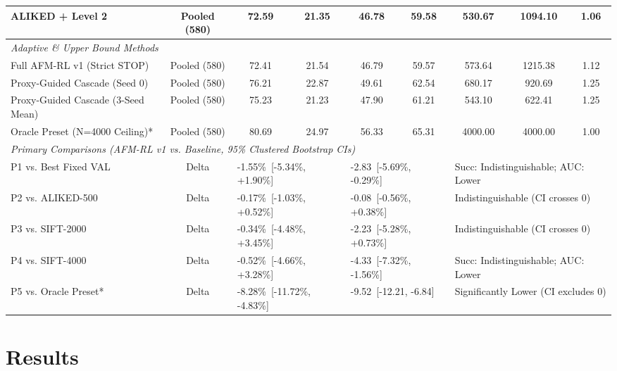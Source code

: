 \documentclass[conference]{IEEEtran}
\begin{document}
\begin{table}[t]
\begin{tabular}{lcccccccc}
ALIKED + Level 2 & Pooled (580) & 72.59 & 21.35 & 46.78 & 59.58 & 530.67 & 1094.10 & 1.06 \\
\hline
\multicolumn{9}{l}{\textit{Adaptive \& Upper Bound Methods}} \\
Full AFM-RL v1 (Strict STOP) & Pooled (580) & 72.41 & 21.54 & 46.79 & 59.57 & 573.64 & 1215.38 & 1.12 \\
Proxy-Guided Cascade (Seed 0) & Pooled (580) & 76.21 & 22.87 & 49.61 & 62.54 & 680.17 & 920.69 & 1.25 \\
Proxy-Guided Cascade (3-Seed Mean) & Pooled (580) & 75.23 & 21.23 & 47.90 & 61.21 & 543.10 & 622.41 & 1.25 \\
Oracle Preset (N=4000 Ceiling)* & Pooled (580) & 80.69 & 24.97 & 56.33 & 65.31 & 4000.00 & 4000.00 & 1.00 \\
\hline
\multicolumn{9}{l}{\textit{Primary Comparisons (AFM-RL v1 vs. Baseline, 95\% Clustered Bootstrap CIs)}} \\
P1 vs. Best Fixed VAL & Delta & \multicolumn{2}{l}{-1.55\%\ [-5.34\%, +1.90\%]} & \multicolumn{2}{l}{-2.83\ [-5.69\%, -0.29\%]} & \multicolumn{3}{l}{Succ: Indistinguishable; AUC: Lower} \\
P2 vs. ALIKED-500 & Delta & \multicolumn{2}{l}{-0.17\%\ [-1.03\%, +0.52\%]} & \multicolumn{2}{l}{-0.08\ [-0.56\%, +0.38\%]} & \multicolumn{3}{l}{Indistinguishable (CI crosses 0)} \\
P3 vs. SIFT-2000 & Delta & \multicolumn{2}{l}{-0.34\%\ [-4.48\%, +3.45\%]} & \multicolumn{2}{l}{-2.23\ [-5.28\%, +0.73\%]} & \multicolumn{3}{l}{Indistinguishable (CI crosses 0)} \\
P4 vs. SIFT-4000 & Delta & \multicolumn{2}{l}{-0.52\%\ [-4.66\%, +3.28\%]} & \multicolumn{2}{l}{-4.33\ [-7.32\%, -1.56\%]} & \multicolumn{3}{l}{Succ: Indistinguishable; AUC: Lower} \\
P5 vs. Oracle Preset* & Delta & \multicolumn{2}{l}{-8.28\%\ [-11.72\%, -4.83\%]} & \multicolumn{2}{l}{-9.52\ [-12.21, -6.84]} & \multicolumn{3}{l}{Significantly Lower (CI excludes 0)} \\
\hline
\end{tabular}
\end{table}

\section{Results}
\label{sec:results}
\end{document}
